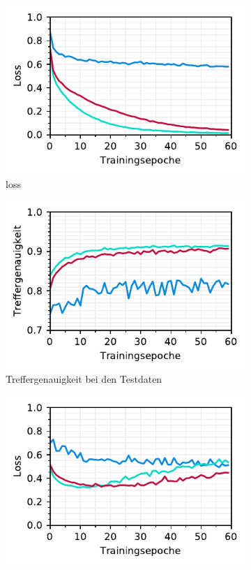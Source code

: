 \begin{figure}[h!]
\begin{subfigure}[b]{0.5\linewidth}
    \includegraphics[scale=1]{graphics/matplot/img-class__loss.pdf}
    \caption{loss} 
    \label{image-class-results:b} 
    \vspace{2ex}
  \end{subfigure} 
  \begin{subfigure}[b]{0.5\linewidth}
    \centering
    \includegraphics[scale=1]{graphics/matplot/img-class__val_acc.pdf}
    \caption{Treffergenauigkeit bei den Testdaten} 
    \label{image-class-results:c} 
  \end{subfigure}%
  \begin{subfigure}[b]{0.5\linewidth}
    \centering
    \includegraphics[scale=1]{graphics/matplot/img-class__val_loss.pdf}

\end{subfigure}
\end{figure}
